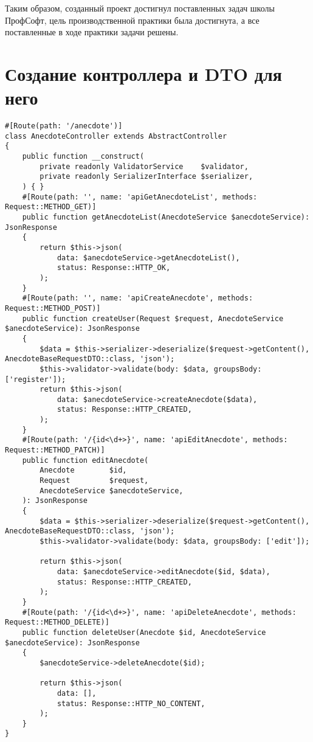\documentclass[pract]{SCWorks}
\begin{document}
Таким образом, созданный проект достигнул поставленных задач школы ПрофСофт,
цель производственной практики была достигнута, а все поставленные в ходе
практики задачи решены.




\appendix

\section{Создание контроллера и DTO для него}
\label{appendA}

\begin{verbatim}
#[Route(path: '/anecdote')]
class AnecdoteController extends AbstractController
{
    public function __construct(
        private readonly ValidatorService    $validator,
        private readonly SerializerInterface $serializer,
    ) { }
    #[Route(path: '', name: 'apiGetAnecdoteList', methods: Request::METHOD_GET)]
    public function getAnecdoteList(AnecdoteService $anecdoteService): JsonResponse
    {
        return $this->json(
            data: $anecdoteService->getAnecdoteList(),
            status: Response::HTTP_OK,
        );
    }
    #[Route(path: '', name: 'apiCreateAnecdote', methods: Request::METHOD_POST)]
    public function createUser(Request $request, AnecdoteService $anecdoteService): JsonResponse
    {
        $data = $this->serializer->deserialize($request->getContent(), AnecdoteBaseRequestDTO::class, 'json');
        $this->validator->validate(body: $data, groupsBody: ['register']);
        return $this->json(
            data: $anecdoteService->createAnecdote($data),
            status: Response::HTTP_CREATED,
        );
    }
    #[Route(path: '/{id<\d+>}', name: 'apiEditAnecdote', methods: Request::METHOD_PATCH)]
    public function editAnecdote(
        Anecdote        $id,
        Request         $request,
        AnecdoteService $anecdoteService,
    ): JsonResponse
    {
        $data = $this->serializer->deserialize($request->getContent(), AnecdoteBaseRequestDTO::class, 'json');
        $this->validator->validate(body: $data, groupsBody: ['edit']);

        return $this->json(
            data: $anecdoteService->editAnecdote($id, $data),
            status: Response::HTTP_CREATED,
        );
    }
    #[Route(path: '/{id<\d+>}', name: 'apiDeleteAnecdote', methods: Request::METHOD_DELETE)]
    public function deleteUser(Anecdote $id, AnecdoteService $anecdoteService): JsonResponse
    {
        $anecdoteService->deleteAnecdote($id);

        return $this->json(
            data: [],
            status: Response::HTTP_NO_CONTENT,
        );
    }
}
\end{verbatim}
\end{document}
